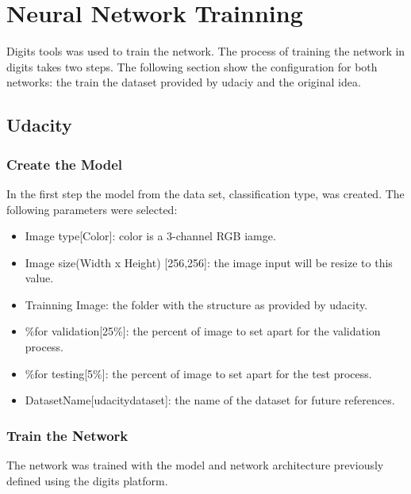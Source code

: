 \documentclass[10pt,journal,compsoc]{IEEEtran}
\begin{document}
\section{Neural Network Trainning}

Digits tools was used to train the network. The process of training the network in digits takes two steps. The following section show the configuration for both networks: the train the dataset provided by udaciy and the original idea.

\subsection{Udacity}
\subsubsection{Create the Model}

In the first step the model from the data set, classification type, was created. The following parameters were selected:

\begin{itemize}
\item Image type[Color]: color is a  3-channel RGB iamge.
\item Image size(Width x Height) [256,256]: the image input will be resize to this value. 
\item Trainning Image: the folder with the structure as provided by udacity.
\item \%for validation[25\%]: the percent of image to set apart for the validation process.
\item \%for testing[5\%]: the percent of image to set apart for the test process.
\item DatasetName[udacity\-dataset]: the name of the dataset for future references.
\end{itemize}

\subsubsection{Train the Network}

The network was trained with the model and network architecture previously defined using the digits platform.
\end{document}
